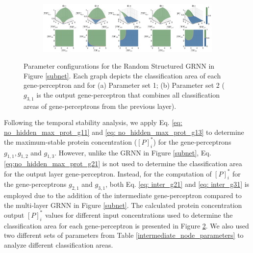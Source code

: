\documentclass[twocolumn]{biophys-new}
\begin{document}
{{\begin{figure}[!t]
\begin{subfigure}{0.9\textwidth}
    \includegraphics[width=\textwidth]{figures/inter_node_para_set-2.pdf}
    \caption{}
    \label{fig:inter_node_para_set_2}
\end{subfigure}
\vspace{-0.5em}
\caption{Parameter configurations for the Random Structured GRNN in Figure \ref{subnet}. Each graph depicts the classification area of each gene-perceptron and for (a) Parameter set 1; (b) Parameter set 2 ($g_{3,1}$ is the output gene-perceptron that combines all classification areas of gene-perceptrons from the previous layer). \vspace{-0.5em}}
\label{fig:inter_node_para_config}

\end{figure}

Following the temporal stability analysis, we apply Eq. \ref{eq: no_hidden_max_prot_g11} and \ref{eq: no_hidden_max_prot_g13} to  determine the maximum-stable protein concentration ($[P]^*_i$) for the gene-perceptrons $g_{1,1}, g_{1,2}$ and $g_{1,3}$. 
However, unlike the GRNN in Figure \ref{subnet}, Eq. \ref{eq:no_hidden_max_prot_g21} is not used to determine the classification area for the output layer gene-perceptron. 
Instead, for the computation of  $[P]^*_i$ for the gene-perceptrons $g_{2,1}$ and $g_{3,1}$, both Eq. \ref{eq: inter_g21} and \ref{eq: inter_g31} is employed due to the addition of the intermediate gene-perceptron compared to the multi-layer GRNN in Figure \ref{subnet}. The calculated protein concentration output $[P]^*_i$ values for different input concentrations used to determine the classification area for each gene-perceptron is presented in Figure \ref{fig:inter_node_para_config}. 
We also used two different sets of parameters from Table \ref{intermediate_node_parameters} to analyze different classification areas.

}}
\end{document}
